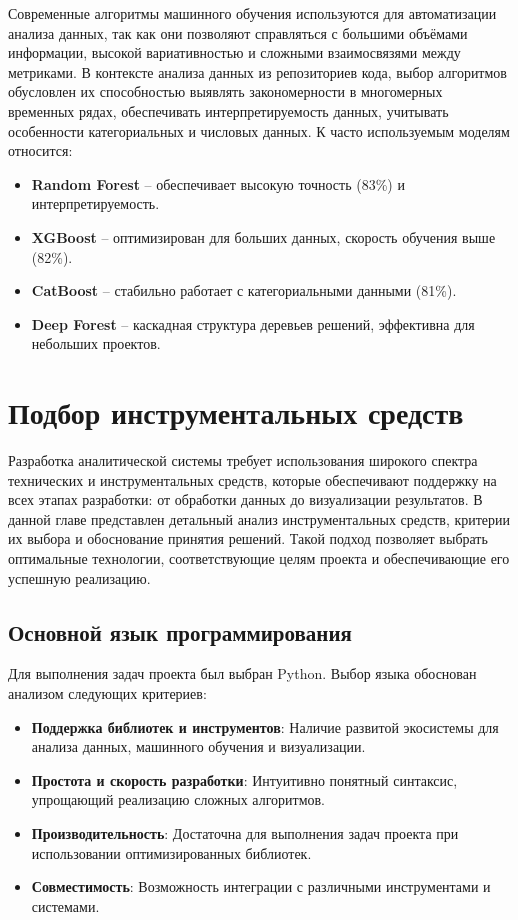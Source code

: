 Современные алгоритмы машинного обучения используются для автоматизации анализа данных, так как они позволяют справляться с большими объёмами информации, высокой вариативностью и сложными взаимосвязями между метриками. В контексте анализа данных из репозиториев кода, выбор алгоритмов обусловлен их способностью выявлять закономерности в многомерных временных рядах, обеспечивать интерпретируемость данных, учитывать особенности категориальных и числовых данных. К часто используемым моделям относится:
\begin{itemize}
	\item \textbf{Random Forest} – обеспечивает высокую точность (83\%) и интерпретируемость.
	\item \textbf{XGBoost} – оптимизирован для больших данных, скорость обучения выше (82\%).
	\item \textbf{CatBoost} – стабильно работает с категориальными данными (81\%).
	\item \textbf{Deep Forest} – каскадная структура деревьев решений, эффективна для небольших проектов.
\end{itemize}

\section{Подбор инструментальных средств} \label{ch1:sec4}

Разработка аналитической системы требует использования широкого спектра технических и инструментальных средств, которые обеспечивают поддержку на всех этапах разработки: от обработки данных до визуализации результатов. В данной главе представлен детальный анализ инструментальных средств, критерии их выбора и обоснование принятия решений. Такой подход позволяет выбрать оптимальные технологии, соответствующие целям проекта и обеспечивающие его успешную реализацию.

\subsection{Основной язык программирования}
Для выполнения задач проекта был выбран Python. Выбор языка обоснован анализом следующих критериев:
\begin{itemize}
	\item \textbf{Поддержка библиотек и инструментов}: Наличие развитой экосистемы для анализа данных, машинного обучения и визуализации.
	\item \textbf{Простота и скорость разработки}: Интуитивно понятный синтаксис, упрощающий реализацию сложных алгоритмов.
	\item \textbf{Производительность}: Достаточна для выполнения задач проекта при использовании оптимизированных библиотек.
	\item \textbf{Совместимость}: Возможность интеграции с различными инструментами и системами.
\end{itemize}

